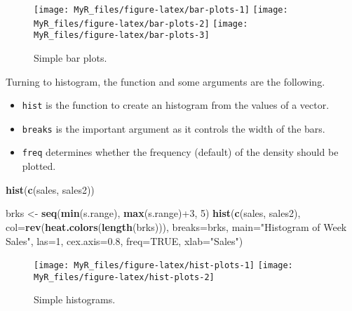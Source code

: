 \documentclass[]{book}
\newenvironment{Shaded}{}{}
\newcommand{\DataTypeTok}[1]{\textcolor[rgb]{0.56,0.13,0.00}{#1}}
\newcommand{\DecValTok}[1]{\textcolor[rgb]{0.25,0.63,0.44}{#1}}
\newcommand{\FloatTok}[1]{\textcolor[rgb]{0.25,0.63,0.44}{#1}}
\newcommand{\KeywordTok}[1]{\textcolor[rgb]{0.00,0.44,0.13}{\textbf{#1}}}
\newcommand{\NormalTok}[1]{#1}
\newcommand{\OperatorTok}[1]{\textcolor[rgb]{0.40,0.40,0.40}{#1}}
\newcommand{\OtherTok}[1]{\textcolor[rgb]{0.00,0.44,0.13}{#1}}
\newcommand{\StringTok}[1]{\textcolor[rgb]{0.25,0.44,0.63}{#1}}
\providecommand{\tightlist}{%
  \setlength{\itemsep}{0pt}\setlength{\parskip}{0pt}}
\theoremstyle{definition}
\theoremstyle{definition}
\theoremstyle{definition}
\theoremstyle{remark}
\begin{document}
\begin{figure}

{\centering \texttt{[image: MyR\_files/figure-latex/bar-plots-1]} \texttt{[image: MyR\_files/figure-latex/bar-plots-2]} \texttt{[image: MyR\_files/figure-latex/bar-plots-3]} 

}

\caption{Simple bar plots.}\label{fig:bar-plots}
\end{figure}

Turning to histogram, the function and some arguments are the following.

\begin{itemize}
\tightlist
\item
  \texttt{hist} is the function to create an histogram from the values
  of a vector.
\item
  \texttt{breaks} is the important argument as it controls the width of
  the bars.
\item
  \texttt{freq} determines whether the frequency (default) of the
  density should be plotted.
\end{itemize}

\begin{Shaded}
\begin{Highlighting}[]
\KeywordTok{hist}\NormalTok{(}\KeywordTok{c}\NormalTok{(sales, sales2))}

\NormalTok{brks <-}\StringTok{ }\KeywordTok{seq}\NormalTok{(}\KeywordTok{min}\NormalTok{(s.range), }\KeywordTok{max}\NormalTok{(s.range)}\OperatorTok{+}\DecValTok{3}\NormalTok{, }\DecValTok{5}\NormalTok{)}
\KeywordTok{hist}\NormalTok{(}\KeywordTok{c}\NormalTok{(sales, sales2),}
    \DataTypeTok{col=}\KeywordTok{rev}\NormalTok{(}\KeywordTok{heat.colors}\NormalTok{(}\KeywordTok{length}\NormalTok{(brks))),}
    \DataTypeTok{breaks=}\NormalTok{brks,}
    \DataTypeTok{main=}\StringTok{"Histogram of Week Sales"}\NormalTok{,}
    \DataTypeTok{las=}\DecValTok{1}\NormalTok{, }\DataTypeTok{cex.axis=}\FloatTok{0.8}\NormalTok{,}
    \DataTypeTok{freq=}\OtherTok{TRUE}\NormalTok{,}
    \DataTypeTok{xlab=}\StringTok{"Sales"}\NormalTok{)}
\end{Highlighting}
\end{Shaded}

\begin{figure}

{\centering \texttt{[image: MyR\_files/figure-latex/hist-plots-1]} \texttt{[image: MyR\_files/figure-latex/hist-plots-2]} 

}

\caption{Simple histograms.}\label{fig:hist-plots}
\end{figure}
\end{document}
